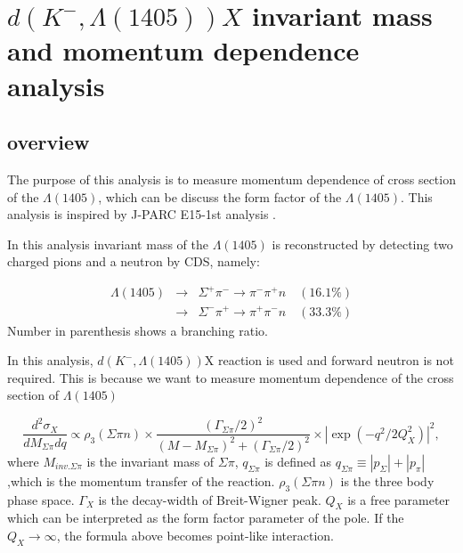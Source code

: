 \section{ $d(K^-,\Lambda(1405))X $ invariant mass and momentum dependence analysis}
\subsection{overview}
The purpose of this analysis is to measure momentum dependence of cross section of the $\Lambda (1405)$, which can be discuss the form factor of the $\Lambda (1405)$. 
This analysis is inspired by J-PARC E15-1st analysis \cite{Sada:2016nkb}.


In this analysis invariant mass of the $\Lambda (1405)$ is reconstructed by detecting two charged pions and a neutron by CDS, namely:

\begin{eqnarray}
\Lambda (1405) & \rightarrow & \Sigma^+\pi^-  \rightarrow {\pi^-\pi^+}n \quad (16.1\%)  \nonumber \\
               & \rightarrow & \Sigma^-\pi^+  \rightarrow {\pi^+\pi^-}n \quad (33.3\%)
\end{eqnarray}
Number in parenthesis shows a branching ratio.

In this analysis,
$d(K^-,\Lambda (1405) )$X reaction is used and forward neutron is not required. This is because we want to measure momentum dependence of the cross section of $\Lambda (1405)$


\begin{equation} \label{formfactor} 
  \frac{d^2 \sigma _X}{dM_{\Sigma \pi} dq} \propto \rho _{3}(\Sigma \pi n) \times     \frac{(\Gamma _{\Sigma \pi} /2)^2}{(M - M_{\Sigma \pi})^2 + (\Gamma _{\Sigma \pi} /2)^2 } \times  | \exp{(-q^2/2Q_{X}^2)}|^2 ,
\end{equation} 
where $M_{inv.\Sigma \pi}$ is the invariant mass of $\Sigma \pi$, $q_{\Sigma \pi}$ is defined as $ q_{\Sigma \pi} \equiv |p_\Sigma|  + |p_\pi| $ ,which is the momentum transfer of the reaction. $\rho_{3}(\Sigma \pi n) $ is the three body phase space. $\Gamma_X$ is the decay-width of Breit-Wigner peak. $Q_X$ is a free parameter which can be interpreted as the form factor parameter of the pole.  
If the $Q_X \to \infty $, the formula above becomes point-like interaction.



